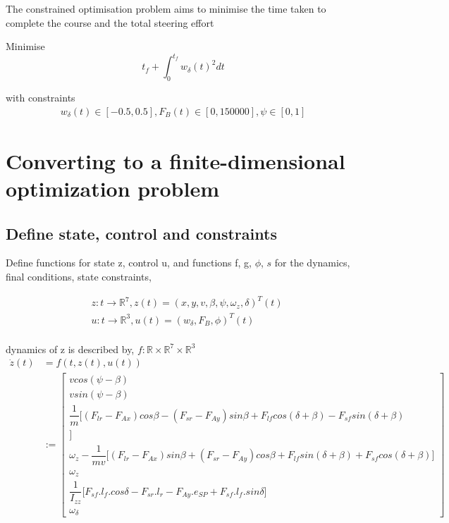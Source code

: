 \documentclass{article}
\begin{document}
The constrained optimisation problem aims to minimise the time taken to complete the course and the total steering effort

Minimise
\begin{equation}
    t_f + \int_0^{t_f} w_\delta(t)^2 dt
\end{equation}

with constraints
\begin{align}
    w_\delta(t) \in [-0.5, 0.5], F_B(t) \in [0,150000], \psi \in [0,1]
\end{align}


\section{Converting to a finite-dimensional optimization problem}

\subsection{Define state, control and constraints}

Define functions for state z, control u, and functions f, g, \(\phi\), \(s\) for the dynamics, final conditions, state constraints, 

\begin{align*}
    & z: t \xrightarrow{} \mathbb{R}^7,  z(t) = (x,y,v,\beta, \psi, \omega_z, \delta)^T(t)\\
    & u: t \xrightarrow{} \mathbb{R}^3, u(t) = (w_\delta, F_B, \phi)^T(t)\\
\end{align*}

dynamics of z is described by, \(f: \mathbb{R} \times \mathbb{R}^7 \times \mathbb{R}^3\)
\begin{align}
    \dot{z}(t) &= f(t,z(t),u(t))\\ & := \begin{bmatrix}
                            v cos(\psi - \beta) \\
                             v sin(\psi - \beta) \\
                             \dfrac{1}{m} \bigg[ (F_{lr} - F_{Ax})cos\beta - (F_{sr} - F_{Ay})sin\beta + F_{lf}cos(\delta + \beta) - F_{sf}sin(\delta + \beta)\\
    \bigg] \\
    \omega_z - \dfrac{1}{mv}\bigg[ (F_{lr} - F_{Ax})sin\beta + (F_{sr} - F_{Ay})cos\beta + F_{lf}sin(\delta + \beta) + F_{sf}cos(\delta + \beta)
    \bigg] \\
                            \omega_z \\
                            \dfrac{1}{I_{zz}}\bigg[ F_{sf}.l_f.cos\delta - F_{sr}.l_r - F_{Ay}.e_{SP} + F_{sf}.l_f.sin\delta \bigg]\\
                              \omega_\delta
            \end{bmatrix}
\end{align}
\end{document}
